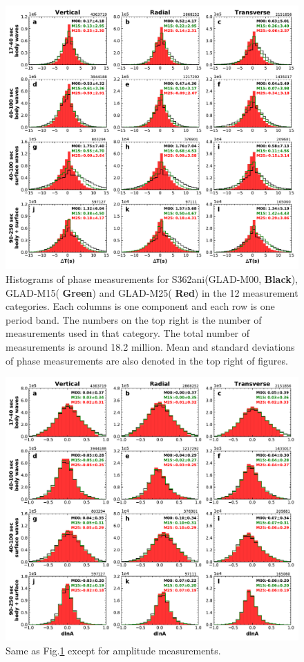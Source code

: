 \documentclass[extra,mreferee]{gji}
\begin{document}
\begin{figure}
  \centering
  \includegraphics[width=\textwidth]{figures/dt_histogram.pdf}
  \caption{Histograms of phase measurements for S362ani(GLAD-M00, \textbf{Black}), GLAD-M15(\textbf{{\color{ForestGreen} Green}}) and GLAD-M25(\textbf{{\color{Red} Red}}) in the 12 measurement categories. Each columns is one component and each row is one period band. The numbers on the top right is the number of measurements used in that category. The total number of measurements is around 18.2 million. Mean and standard deviations of phase measurements are also denoted in the top right of figures.}
  \label{fig:phase_hist}
\end{figure}

\begin{figure}
  \centering
  \includegraphics[width=\textwidth]{figures/dlna_histogram.pdf}
  \caption{Same as Fig.\ref{fig:phase_hist} except for amplitude measurements.}
  \label{fig:amp_hist}
\end{figure}
\end{document}
